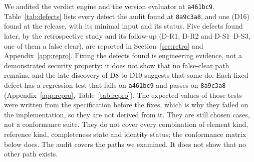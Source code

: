 \documentclass[11pt,a4paper]{article}
\newcommand{\code}[1]{\texttt{#1}}
\newcommand{\commit}{\code{a461bc9}}
\newcommand{\pincommit}{\code{8a9c3a8}}
\begin{document}
We audited the verdict engine and the version evaluator at \commit{}.
Table~\ref{tab:defects} lists every defect the audit found at
\pincommit{}, and one (D16) found at the release, with its minimal
input and its status. Five defects
found later, by the retrospective study and its follow-up (D-R1,
D-R2 and D-S1--D-S3, one of them a false clear), are reported in
Section~\ref{sec:retro} and Appendix~\ref{app:repro}. Fixing the defects found is engineering
evidence, not a demonstrated security property: it does not show that
no false-clear path remains, and the late discovery of D8 to D10
suggests that some do. Each fixed defect has a regression test that
fails on \commit{} and passes on \pincommit{}
(Appendix~\ref{app:repro}, Table~\ref{tab:repro}). The expected values
of those tests were written from the specification before the fixes,
which is why they failed on the implementation, so they are not
derived from it. They are still chosen cases, not a conformance suite.
They do not cover every combination of element kind, reference kind,
completeness state and identity status; the conformance matrix below
does. The audit covers the paths
we examined. It does not show that no other path exists.
\end{document}
